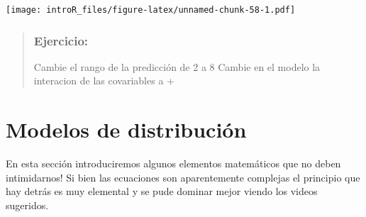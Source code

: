 \documentclass[
]{book}
\newenvironment{Shaded}{\begin{snugshade}}{\end{snugshade}}
\newcommand{\CommentTok}[1]{\textcolor[rgb]{0.56,0.35,0.01}{\textit{#1}}}
\newcommand{\DataTypeTok}[1]{\textcolor[rgb]{0.13,0.29,0.53}{#1}}
\newcommand{\DecValTok}[1]{\textcolor[rgb]{0.00,0.00,0.81}{#1}}
\newcommand{\FloatTok}[1]{\textcolor[rgb]{0.00,0.00,0.81}{#1}}
\newcommand{\KeywordTok}[1]{\textcolor[rgb]{0.13,0.29,0.53}{\textbf{#1}}}
\newcommand{\NormalTok}[1]{#1}
\newcommand{\OperatorTok}[1]{\textcolor[rgb]{0.81,0.36,0.00}{\textbf{#1}}}
\newcommand{\StringTok}[1]{\textcolor[rgb]{0.31,0.60,0.02}{#1}}
\begin{document}
\begin{Shaded}
\end{Shaded}

\texttt{[image: introR\_files/figure-latex/unnamed-chunk-58-1.pdf]}

\begin{quote}
\hypertarget{ejercicio-5}{%
\subsection{Ejercicio:}\label{ejercicio-5}}

Cambie el rango de la predicción de 2 a 8
Cambie en el modelo la interacion de las covariables a +
\end{quote}

\hypertarget{modelos-de-distribuciuxf3n}{%
\chapter{Modelos de distribución}\label{modelos-de-distribuciuxf3n}}

En esta sección introduciremos algunos elementos matemáticos que no deben intimidarnos! Si bien las ecuaciones son aparentemente complejas el principio que hay detrás es muy elemental y se pude dominar mejor viendo los videos sugeridos.
\end{document}
